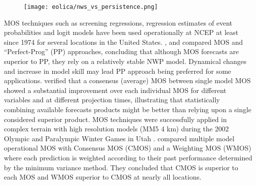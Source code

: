 \begin{figure}[!htp]
    \centering
    \texttt{[image: eolica/nws\_vs\_persistence.png]}
    \label{fig:nwp_pers}
\end{figure}
\FloatBarrier

MOS techniques such as screening regressions, regression estimates of event probabilities and logit models have been used operationally at NCEP at least since 1974 \citep{KleinGlahn1974} for several locations in the United States. \cite{Brunet1988}, \cite{Carter1989} and \cite{JacksEtAl1990} compared MOS and ``Perfect-Prog'' (PP) approaches, concluding that although MOS forecasts are superior to PP, they rely on a relatively stable NWP model. Dynamical changes and increase in model skill may lead PP approach being preferred for some applications. \cite{VislockyFritsch1995} verified that a consensus (average) MOS between single model MOS showed a substantial improvement over each individual MOS for different variables and at different projection times, illustrating that statistically combining available forecasts products might be better than relying upon a single considered superior product. MOS techniques were successfully applied in complex terrain with high resolution models (MM5 4 km) during the 2002 Olympic and Paralympic Winter Games in Utah \citep{HartEtAl2004}. \cite{BaarsMass2005} compared multiple model operational MOS with Consensus MOS (CMOS) and a Weighting MOS (WMOS) where each prediction is weighted according to their past performance determined by the minimum variance method. They concluded that CMOS is superior to each MOS and WMOS superior to CMOS at nearly all locations. 

